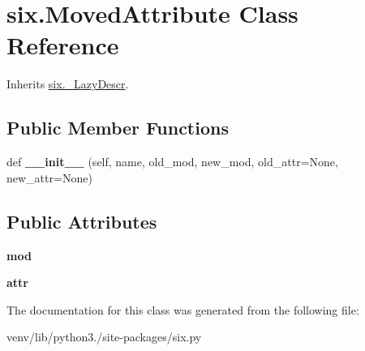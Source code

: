 \hypertarget{classsix_1_1_moved_attribute}{}\section{six.\+Moved\+Attribute Class Reference}
\label{classsix_1_1_moved_attribute}


Inherits \hyperlink{classsix_1_1___lazy_descr}{six.\+\_\+\+Lazy\+Descr}.

\subsection*{Public Member Functions}
\begin{DoxyCompactItemize}
\item 
\mbox{\label{classsix_1_1_moved_attribute_a1240d0b7627c71d6fff8b21ef22013fa}} 
def {\bfseries \+\_\+\+\_\+init\+\_\+\+\_\+} (self, name, old\+\_\+mod, new\+\_\+mod, old\+\_\+attr=None, new\+\_\+attr=None)
\end{DoxyCompactItemize}
\subsection*{Public Attributes}
\begin{DoxyCompactItemize}
\item 
\mbox{\label{classsix_1_1_moved_attribute_af2ed71d99c69389444c7b887df9f6e33}} 
{\bfseries mod}
\item 
\mbox{\label{classsix_1_1_moved_attribute_acd7d59165cf01ac7810cf2a83d7a3628}} 
{\bfseries attr}
\end{DoxyCompactItemize}


The documentation for this class was generated from the following file\+:\begin{DoxyCompactItemize}
\item 
venv/lib/python3./site-\/packages/six.\+py\end{DoxyCompactItemize}
